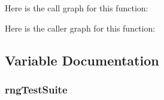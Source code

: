 Here is the call graph for this function\+:




Here is the caller graph for this function\+:




\subsection{Variable Documentation}
\subsubsection[{\texorpdfstring{rng\+Test\+Suite}{rngTestSuite}}]{ rng\+Test\+Suite\hspace{0.3cm}{\ttfamily [static]}}\hypertarget{rng-test-suite_8cc_a4b9911b1848c805692303e3aac0ff2a8}{}\label{rng-test-suite_8cc_a4b9911b1848c805692303e3aac0ff2a8}
